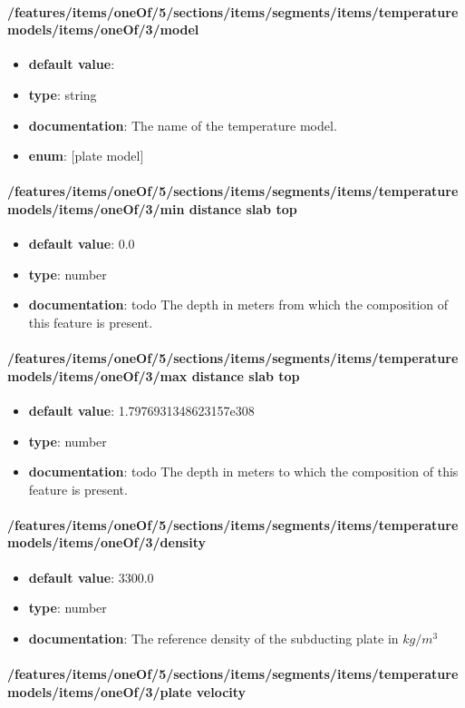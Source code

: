 \paragraph{/features/items/oneOf/5/sections/items/segments/items/temperature models/items/oneOf/3/model}
\begin{itemize}\item {\bf default value}: 
\item {\bf type}: string
\item {\bf documentation}: The name of the temperature model.
\item {\bf enum}: [plate model]\end{itemize}\paragraph{/features/items/oneOf/5/sections/items/segments/items/temperature models/items/oneOf/3/min distance slab top}
\begin{itemize}\item {\bf default value}: 0.0
\item {\bf type}: number
\item {\bf documentation}: todo The depth in meters from which the composition of this feature is present.
\end{itemize}\paragraph{/features/items/oneOf/5/sections/items/segments/items/temperature models/items/oneOf/3/max distance slab top}
\begin{itemize}\item {\bf default value}: 1.7976931348623157e308
\item {\bf type}: number
\item {\bf documentation}: todo The depth in meters to which the composition of this feature is present.
\end{itemize}\paragraph{/features/items/oneOf/5/sections/items/segments/items/temperature models/items/oneOf/3/density}
\begin{itemize}\item {\bf default value}: 3300.0
\item {\bf type}: number
\item {\bf documentation}: The reference density of the subducting plate in $kg/m^3$
\end{itemize}\paragraph{/features/items/oneOf/5/sections/items/segments/items/temperature models/items/oneOf/3/plate velocity}

